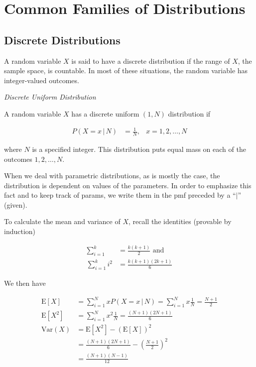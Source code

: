 \documentclass[11pt,a4paper]{report}
\theoremstyle{definition} \newtheorem{defn}{Definition}[section]
\theoremstyle{theorem} \newtheorem{thm}{Theorem}[section]
\theoremstyle{example} \newtheorem{ex}{Example}[section]
\begin{document}
\chapter{Common Families of Distributions}

\section{Discrete Distributions}

A random variable $X$ is said to have a discrete distribution if the
range of $X$, the sample space, is countable.  In most of these
situations, the random variable has integer-valued outcomes.

\textit{Discrete Uniform Distribution}

A random variable $X$ has a discrete uniform $(1,N)$ distribution if

\begin{align*} P(X = x \, | \, N) &= \frac{1}{N}, & x = 1, 2, \dots, N
\end{align*}

where $N$ is a specified integer.  This distribution puts equal mass
on each of the outcomes $1,2,\dots,N$.

When we deal with parametric distributions, as is mostly the case, the
distribution is dependent on values of the parameters.  In order to
emphasize this fact and to keep track of params, we write them in the
pmf preceded by a ``$|$'' (given).

To calculate the mean and variance of $X$, recall the identities
(provable by induction)

\begin{align*} \sum_{i=1}^k &= \frac{k(k+1)}{2} \text{ and } \\
\sum_{i=1}^k i^2 &= \frac{k(k+1)(2k+1)}{6}
\end{align*}

We then have

\begin{align*} \mathrm{E} \left[ X \right] &= \sum_{i=1}^N x P(X = x
\, | \, N) = \sum_{i=1}^N x \frac{1}{N} = \frac{N+1}{2} \\ \mathrm{E}
\left[ X^2 \right] &= \sum_{i=1}^N x^2 \frac{1}{N} =
\frac{(N+1)(2N+1)}{6} \\ \mathrm{Var}(X) &= \mathrm{E} \left[ X^2
\right] - \left( \mathrm{E} \left[ X \right] \right)^2 \\ &=
\frac{(N+1)(2N+1)}{6} - \left( \frac{N+1}{2} \right)^2 \\ &=
\frac{(N+1)(N-1)}{12}
\end{align*}
\end{document}
